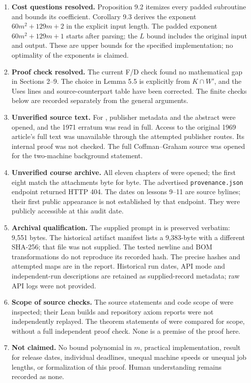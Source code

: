 \begin{enumerate}[leftmargin=*,itemsep=3pt]
\item \textbf{Cost questions resolved.} Proposition 9.2 itemizes every padded subroutine and bounds its coefficient. Corollary 9.3 derives the exponent $60m^2+129m+2$ in the explicit input length. The padded exponent $60m^2+129m+1$ starts after parsing; the $L$ bound includes the original input and output. These are upper bounds for the specified implementation; no optimality of the exponents is claimed.
\item \textbf{Proof check resolved.} The current F/D check found no mathematical gap in Sections 2--9. The choice in Lemma 5.5 is explicitly from $K\cap W'$, and the Uses lines and source-counterpart table have been corrected. The finite checks below are recorded separately from the general arguments.
\item \textbf{Unverified source text.} For \cite{FKN}, publisher metadata and the abstract were opened, and the 1971 erratum \cite{FKNe} was read in full. Access to the original 1969 article's full text was unavailable through the attempted publisher routes. Its internal proof was not checked. The full Coffman--Graham source \cite[Theorem~1]{CG} was opened for the two-machine background statement.
\item \textbf{Unverified course archive.} All eleven chapters of \cite{L} were opened; the first eight match the attachments byte for byte. The advertised \texttt{provenance.json} endpoint returned HTTP 404. The dates on lessons 9--11 are source bylines; their first public appearance is not established by that endpoint. They were publicly accessible at this audit date.
\item \textbf{Archival qualification.} The supplied prompt in  is preserved verbatim: 9,551 bytes. The historical artifact manifest lists a 9,383-byte  with a different SHA-256; that file was not supplied. The tested newline and BOM transformations do not reproduce its recorded hash. The precise hashes and attempted maps are in the report. Historical run dates, API mode and independent-run descriptions are retained as supplied-record metadata; raw API logs were not provided.
\item \textbf{Scope of source checks.} The source statements and code scope of \cite{F,D} were inspected; their Lean builds and repository axiom reports were not independently replayed. The theorem statements of \cite{J,G} were compared for scope, without a full independent proof check. None is a premise of the proof here.
\item \textbf{Not claimed.} No bound polynomial in $m$, practical implementation, result for release dates, individual deadlines, unequal machine speeds or unequal job lengths, or formalization of this proof. Human understanding remains recorded as none.
\end{enumerate}

